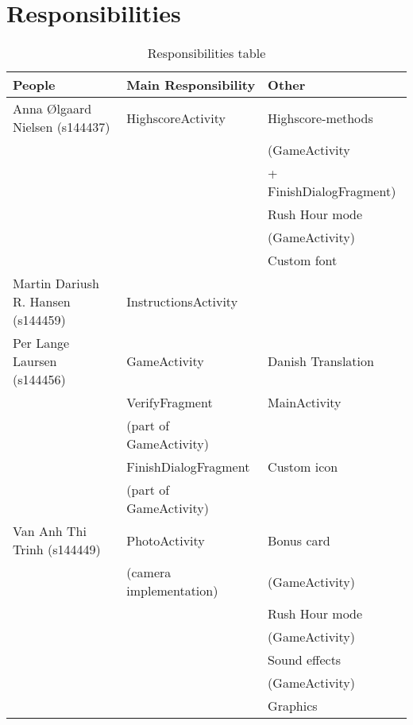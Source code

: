 \section{Responsibilities}
\begin{table}[H]
	\begin{longtable}{|l|l|l|}
		\hline
		People & Main Responsibility & Other \\ \hline
		Anna Ølgaard Nielsen (s144437) & HighscoreActivity & Highscore-methods \\
		& & (GameActivity  \\
		& & + FinishDialogFragment) \\
		& & Rush Hour mode \\
		& & (GameActivity) \\
		& & Custom font \\ \hline
		Martin Dariush R. Hansen (s144459) & InstructionsActivity & \\ \hline
		Per Lange Laursen (s144456) & GameActivity & Danish Translation \\ 
		& VerifyFragment & MainActivity \\
		& (part of GameActivity) &  \\
		& FinishDialogFragment & Custom icon \\ 
		& (part of GameActivity) &  \\ \hline
		Van Anh Thi Trinh (s144449) & PhotoActivity & Bonus card \\ 
		& (camera implementation) & (GameActivity) \\
		& & Rush Hour mode \\ 
		& & (GameActivity) \\ 
		& & Sound effects  \\
		& & (GameActivity) \\
		& & Graphics \\ \hline
	\end{longtable}
	\caption{Responsibilities table}
\end{table}